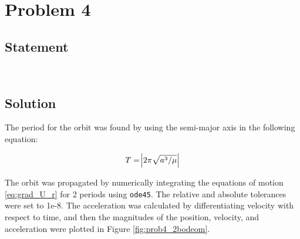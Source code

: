 \documentclass[conf]{new-aiaa}
\begin{document}
\section{Problem 4} 

\subsection{Statement} 
\begin{center}
	 \\
\end{center}

\subsection{Solution} 

The period for the orbit was found by using the semi-major axis in the following equation: 

\begin{equation}
T   = \abs{2 \pi \sqrt{a^3 / \mu}}       %
\end{equation}

The orbit was propagated by numerically integrating the equations of motion \ref{eq:grad_U_r} for 2 periods using \texttt{ode45}. The relative and absolute tolerances were set to 1e-8. The acceleration was calculated by differentiating velocity with respect to time, and then the magnitudes of the position, velocity, and acceleration were plotted in Figure \ref{fig:prob4_2bodeom}. 

\end{document}
